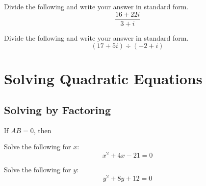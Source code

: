 \vspace{0.5em}

\begin{exercise}
Divide the following and write your answer in standard form.
\[
\frac{16+22i}{3+i}
\]
\end{exercise}
\begin{solution}[2in]

\end{solution}
\vspace{0.5em}

\newpage

\begin{exercise}
Divide the following and write your answer in standard form.
\[
(17+5i)\div(-2+i)
\]
\end{exercise}
\begin{solution}[3.5in]

\end{solution}
\vspace{0.5em}

\section{Solving Quadratic Equations}

\subsection{Solving by Factoring}

\begin{fact}
If $AB=0$, then 
\end{fact}

\begin{exercise}
Solve the following for $x$:
\[
x^2+4x-21=0
\]
\end{exercise}
\begin{solution}[2in]

\end{solution}
\vspace{0.5em}

\newpage

\begin{exercise}
Solve the following for $y$:
\[
y^2+8y+12=0
\]
\end{exercise}
\begin{solution}[3.5in]

\end{solution}
\vspace{0.5em}

